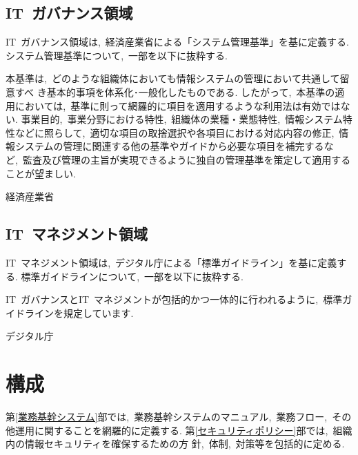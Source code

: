 \subsection{IT~ガバナンス領域}
IT~ガバナンス領域は,~経済産業省による「システム管理基準」を基に定義する.
システム管理基準について,~一部を以下に抜粋する.
\begin{shadebox}
    本基準は,~どのような組織体においても情報システムの管理において共通して留意すべ
    き基本的事項を体系化･一般化したものである.
    したがって,~本基準の適用においては,~基準に則って網羅的に項目を適用するような利用法は有効ではない.
    事業目的,~事業分野における特性,~組織体の業種・業態特性,~情報システム特性などに照らして,~適切な項目の取捨選択や各項目における対応内容の修正,~情報システムの管理に関連する他の基準やガイドから必要な項目を補完するなど,~監査及び管理の主旨が実現できるように独自の管理基準を策定して適用することが望ましい.

    \hfill 経済産業省
\end{shadebox}

\subsection{IT~マネジメント領域}
IT~マネジメント領域は,~デジタル庁による「標準ガイドライン」を基に定義する.
標準ガイドラインについて,~一部を以下に抜粋する.
\begin{shadebox}
    IT~ガバナンスとIT~マネジメントが包括的かつ一体的に行われるように,~標準ガイドラインを規定しています.

    \hfill デジタル庁
\end{shadebox}

\section{構成}
第\ref{業務基幹システム}部では,~業務基幹システムのマニュアル,~業務フロー,~その他運用に関することを網羅的に定義する.
第\ref{セキュリティポリシー}部では,~組織内の情報セキュリティを確保するための方
針,~体制,~対策等を包括的に定める.